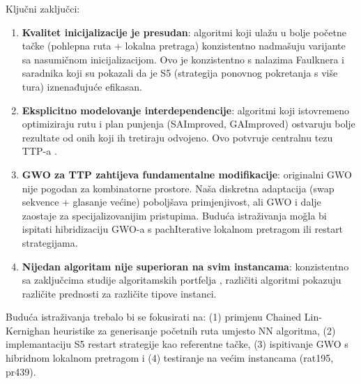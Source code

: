 \documentclass[12pt,a4paper]{article}
\begin{document}
Klju\v{c}ni zaklju\v{c}ci:
\begin{enumerate}
    \item \textbf{Kvalitet inicijalizacije je presudan}: algoritmi koji ulažu u bolje po\v{c}etne ta\v{c}ke (pohlepna ruta + lokalna pretraga) konzistentno nadma\v{s}uju varijante sa nasumi\v{c}nom inicijalizacijom. Ovo je konzistentno s nalazima Faulknera i saradnika \cite{faulkner2015} koji su pokazali da je S5 (strategija ponovnog pokretanja s vi\v{s}e tura) iznenađuju\'{c}e efikasan.
    \item \textbf{Eksplicitno modelovanje interdependencije}: algoritmi koji istovremeno optimiziraju rutu i plan punjenja (SAImproved, GAImproved) ostvaruju bolje rezultate od onih koji ih tretiraju odvojeno. Ovo potvr\dj{}uje centralnu tezu TTP-a \cite{bonyadi2013,mei2014}.
    \item \textbf{GWO za TTP zahtijeva fundamentalne modifikacije}: originalni GWO nije pogodan za kombinatorne prostore. Na\v{s}a diskretna adaptacija (swap sekvence + glasanje ve\'{c}ine) poboljšava primjenjivost, ali GWO i dalje zaostaje za specijalizovanijim pristupima. Budu\'{c}a istra\v{z}ivanja mo\v{g}la bi ispitati hibridizaciju GWO-a s pachIterative lokalnom pretragom ili restart strategijama.
    \item \textbf{Nijedan algoritam nije superioran na svim instancama}: konzistentno sa zaklju\v{c}cima studije algoritamskih portfelja \cite{wagner_selection}, razli\v{c}iti algoritmi pokazuju razli\v{c}ite prednosti za razli\v{c}ite tipove instanci.
\end{enumerate}

Budu\'{c}a istra\v{z}ivanja trebalo bi se fokusirati na: (1) primjenu Chained Lin-Kernighan heuristike za generisanje po\v{c}etnih ruta umjesto NN algoritma, (2) implemantaciju S5 restart strategije kao referentne ta\v{c}ke, (3) ispitivanje GWO s hibridnom lokalnom pretragom i (4) testiranje na ve\'{c}im instancama (rat195, pr439).
\end{document}
